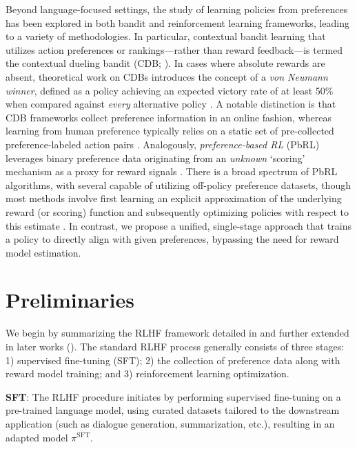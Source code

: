 Beyond language-focused settings, the study of learning policies from preferences has been explored in both bandit and reinforcement learning frameworks, leading to a variety of methodologies. In particular, contextual bandit learning that utilizes action preferences or rankings—rather than reward feedback—is termed the contextual dueling bandit (CDB; \cite{yue2012karmed,dudik2015contextual}). In cases where absolute rewards are absent, theoretical work on CDBs introduces the concept of a \textit{von Neumann winner}, defined as a policy achieving an expected victory rate of at least 50\% when compared against \textit{every} alternative policy \citep{dudik2015contextual}. A notable distinction is that CDB frameworks collect preference information in an online fashion, whereas learning from human preference typically relies on a static set of pre-collected preference-labeled action pairs \citep{yan2022human}. Analogously, \textit{preference-based RL} (PbRL) leverages binary preference data originating from an \textit{unknown} `scoring' mechanism as a proxy for reward signals \citep{BusaFekete2014,ruiz2023dueling}. There is a broad spectrum of PbRL algorithms, with several capable of utilizing off-policy preference datasets, though most methods involve first learning an explicit approximation of the underlying reward (or scoring) function and subsequently optimizing policies with respect to this estimate \citep{jain2013learning,BusaFekete2014,christiano2017deep,sadigh2017active,kupcsik2018learning}. In contrast, we propose a unified, single-stage approach that trains a policy to directly align with given preferences, bypassing the need for reward model estimation.

\section{Preliminaries}\label{section:prelims}

We begin by summarizing the RLHF framework detailed in \citeauthor{ziegler2020finetuning} and further extended in later works (\citep{stiennon2022learning, bai2022training, ouyang2022training}). The standard RLHF process generally consists of three stages: 1) supervised fine-tuning (SFT); 2) the collection of preference data along with reward model training; and 3) reinforcement learning optimization.

\textbf{SFT}: The RLHF procedure initiates by performing supervised fine-tuning on a pre-trained language model, using curated datasets tailored to the downstream application (such as dialogue generation, summarization, etc.), resulting in an adapted model $\pi^\text{SFT}$.

